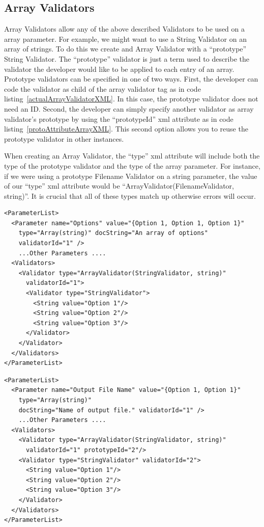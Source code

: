 \subsection{Array Validators}
Array Validators allow any of the above described Validators to be used on a array parameter. For example, we might want to use a
String Validator on an array of strings. To do this we create and Array Validator with a ``prototype'' String Validator. The 
``prototype'' validator is just a term used to describe the validator the developer would like to be applied to each entry of an
array. Prototype validators can be specified in one of two ways. First, the developer can code the validator as child of the array validator
tag as in code listing~\ref{actualArrayValidatorXML}. In this case, the prototype validator does not need an ID. 
Second, the developer can simply specify another validator as array validator's  prototype by using the
``prototypeId'' xml attribute as in code listing~\ref{protoAttributeArrayXML}. This second option allows you to reuse the prototype validator in other instances.

When creating an Array Validator, the ``type'' xml attribute will include both the type of the prototype validator and the type of the array
parameter. For instance, if we were using a prototype Filename Validator on a string parameter, the value of our ``type'' xml attribute would
be ``ArrayValidator(FilenameValidator, string)''. It is crucial that all of these types match up otherwise errors will occur.

\begin{lstlisting}[caption={Example usage of an Array Validator in which the prototype validator is declared as a child of the array validator}, label=actualArrayValidatorXML]
<ParameterList>
  <Parameter name="Options" value="{Option 1, Option 1, Option 1}" 
    type="Array(string)" docString="An array of options" 
    validatorId="1" />
    ...Other Parameters ....
  <Validators>
    <Validator type="ArrayValidator(StringValidator, string)" 
      validatorId="1">
      <Validator type="StringValidator">
        <String value="Option 1"/>
        <String value="Option 2"/>
        <String value="Option 3"/>
      </Validator>
    </Validator>
  </Validators>
</ParameterList>
\end{lstlisting}

\begin{lstlisting}[caption={Example usage of an Array Validator in which the prototype is specified usnig the prototypeId xml attribute}, label=protoAttributeArrayXML]
<ParameterList>
  <Parameter name="Output File Name" value="{Option 1, Option 1}" 
    type="Array(string)" 
    docString="Name of output file." validatorId="1" />
    ...Other Parameters ....
  <Validators>
    <Validator type="ArrayValidator(StringValidator, string)" 
      validatorId="1" prototypeId="2"/>
    <Validator type="StringValidator" validatorId="2">
      <String value="Option 1"/>
      <String value="Option 2"/>
      <String value="Option 3"/>
    </Validator>
  </Validators>
</ParameterList>
\end{lstlisting}

